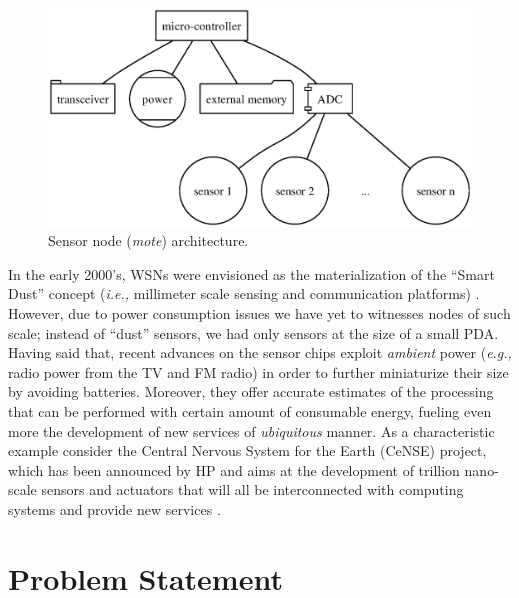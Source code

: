 \begin{figure}[htp]
\centering
	\includegraphics[scale=0.7]{fig/mote_arch.eps}
	\caption{Sensor node (\textit{mote}) architecture.}
	\label{fig:mote_arch}
\end{figure}

In the early 2000's, WSNs were envisioned as the materialization of the
``Smart Dust'' concept (\textit{i.e.,} millimeter scale sensing and
communication platforms) \cite{smartdust}. However, due to power
consumption issues we have yet to witnesses nodes of such scale; instead
of ``dust'' sensors, we had only sensors at the size of a small PDA.
Having said that, recent advances on the sensor chips exploit
\textit{ambient} power (\textit{e.g.,} radio power from the TV and FM
radio) in order to further miniaturize their size by avoiding batteries.
Moreover, they offer accurate estimates of the processing that can be
performed with certain amount of consumable energy, fueling even more the 
development of new services of \textit{ubiquitous} manner. As a
characteristic example consider the Central Nervous System for the Earth 
(CeNSE) project, which has been announced by HP and aims at the
development of trillion nano-scale sensors and actuators that will all be
interconnected with computing systems and provide new services
\cite{cense}.


\section{Problem Statement}

